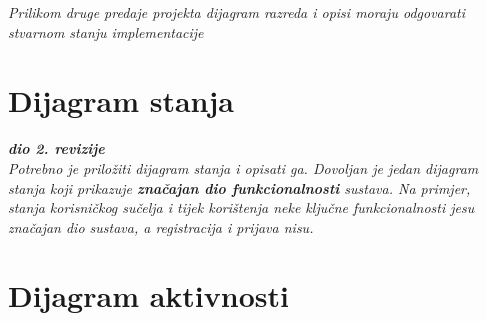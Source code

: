 		\textit{Prilikom druge predaje projekta dijagram razreda i opisi moraju odgovarati stvarnom stanju implementacije}
			
			
			
			\eject
		
		\section{Dijagram stanja}
			
			
			\textbf{\textit{dio 2. revizije}}\\
			
			\textit{Potrebno je priložiti dijagram stanja i opisati ga. Dovoljan je jedan dijagram stanja koji prikazuje \textbf{značajan dio funkcionalnosti} sustava. Na primjer, stanja korisničkog sučelja i tijek korištenja neke ključne funkcionalnosti jesu značajan dio sustava, a registracija i prijava nisu. }
			
			
			\eject 
		\section{Dijagram aktivnosti}
  
